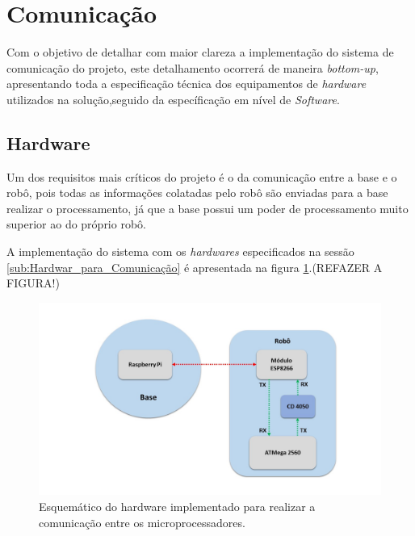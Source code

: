 \section{Comunicação} %
\label{sec:comunicação2}

	Com o objetivo de detalhar com maior clareza a implementação do sistema de comunicação do projeto, este detalhamento ocorrerá de maneira \textit{bottom-up}, apresentando toda a especificação técnica dos equipamentos de \textit{hardware} utilizados na solução,seguido da específicação em nível de \textit{Software}.

	\subsection{Hardware} %
	\label{sub:hardware}
		Um dos requisitos mais críticos do projeto é o da comunicação entre a base e o robô, pois todas as informações colatadas pelo robô são enviadas para a base realizar o processamento, já que a base possui um poder de processamento muito superior ao do próprio robô.

		A implementação do sistema com os \textit{hardwares} especificados na sessão \ref{sub:Hardwar_para_Comunicação} é apresentada na figura \ref{img:hardware_comunicação}.(REFAZER A FIGURA!)

		\begin{figure}[H]                                                           
      		\centering                    
      		\includegraphics[scale=0.5]{figuras/Hardware_Comunicacao.jpg}               
      		\caption{Esquemático do hardware implementado para realizar a comunicação entre os microprocessadores.}    
      		\label{img:hardware_comunicação}                                            
    	\end{figure}


